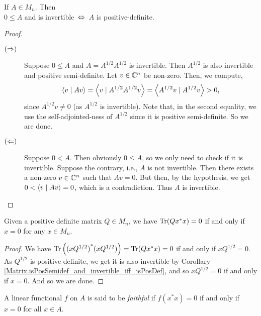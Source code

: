\begin{corollary}\label{Matrix.isPosSemidef_and_invertible_iff_isPosDef}\leanok
  If $A\in{M_n}$. Then\\
  \hspace*{0.5cm}$0\leq{A}$ and is invertible $\,\Leftrightarrow\,$ $A$ is positive-definite.
 \end{corollary}
 \begin{proof}\leanok {\ }
  \begin{description}
   \item[$(\Rightarrow)$]
    Suppose $0\leq{A}$ and $A=A^{1/2}A^{1/2}$ is invertible. Then $A^{1/2}$ is also invertible and positive semi-definite. Let $v\in\mathbb{C}^n$ be non-zero.
    Then, we compute,
    \[\left\langle v \mid Av\right\rangle=\left\langle v \mid A^{1/2}A^{1/2}v\right\rangle=\left\langle A^{1/2}v \mid A^{1/2}v\right\rangle>0,\]
    since $A^{1/2}v\neq0$ (as $A^{1/2}$ is invertible). Note that, in the second equality, we use the self-adjointed-ness of $A^{1/2}$ since it is positive semi-definite. So we are done.
   \item[$(\Leftarrow)$]
    Suppose $0<A$. Then obviously $0\leq{A}$, so we only need to check if it is invertible. Suppose the contrary, i.e., $A$ is not invertible. Then there exists a non-zero $v\in\mathbb{C}^n$ such that $Av=0$. But then, by the hypothesis, we get $0<\left\langle v \mid Av\right\rangle=0$, which is a contradiction. Thus $A$ is invertible.
  \end{description}
 \end{proof}


\begin{lemma}\label{PosDef.trace_conjTranspose_mul_self_eq_zero_iff}\leanok
  Given a positive definite matrix $Q\in{M_n}$, we have $\operatorname{Tr}(Qx^*x)=0$ if and only if $x=0$ for any $x\in{M_n}$.
 \end{lemma}
 \begin{proof}\leanok
  We have $\operatorname{Tr}\left({(xQ^{1/2})}^*(xQ^{1/2})\right)=\operatorname{Tr}(Qx^*x)=0$ if and only if $xQ^{1/2}=0$. As $Q^{1/2}$ is positive definite, we get it is also invertible by Corollary \ref{Matrix.isPosSemidef_and_invertible_iff_isPosDef}, and so $xQ^{1/2}=0$ if and only if $x=0$. And so we are done.
 \end{proof}

  \begin{definition}\label{Dual.IsFaithful}\leanok
   A linear functional $f$ on $A$ is said to be \textit{faithful} if $f(x^*x)=0$ if and only if $x=0$ for all $x\in A$.
  \end{definition}

